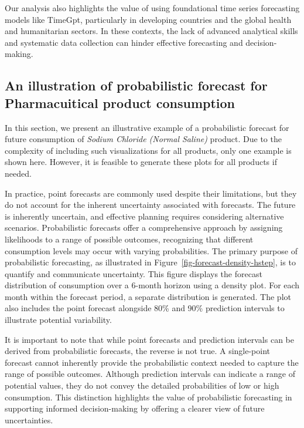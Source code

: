 \documentclass[
  authoryear,
  preprint,
  3p]{elsarticle}
\begin{document}
Our analysis also highlights the value of using foundational time series
forecasting models like TimeGpt, particularly in developing countries
and the global health and humanitarian sectors. In these contexts, the
lack of advanced analytical skills and systematic data collection can
hinder effective forecasting and decision-making.

\subsection{An illustration of probabilistic forecast for Pharmacuitical
product
consumption}\label{an-illustration-of-probabilistic-forecast-for-pharmacuitical-product-consumption}

In this section, we present an illustrative example of a probabilistic
forecast for future consumption of \emph{Sodium Chloride (Normal
Saline)} product. Due to the complexity of including such visualizations
for all products, only one example is shown here. However, it is
feasible to generate these plots for all products if needed.

In practice, point forecasts are commonly used despite their
limitations, but they do not account for the inherent uncertainty
associated with forecasts. The future is inherently uncertain, and
effective planning requires considering alternative scenarios.
Probabilistic forecasts offer a comprehensive approach by assigning
likelihoods to a range of possible outcomes, recognizing that different
consumption levels may occur with varying probabilities. The primary
purpose of probabilistic forecasting, as illustrated in
Figure~\ref{fig-forecast-density-hstep}, is to quantify and communicate
uncertainty. This figure displays the forecast distribution of
consumption over a 6-month horizon using a density plot. For each month
within the forecast period, a separate distribution is generated. The
plot also includes the point forecast alongside 80\% and 90\% prediction
intervals to illustrate potential variability.

It is important to note that while point forecasts and prediction
intervals can be derived from probabilistic forecasts, the reverse is
not true. A single-point forecast cannot inherently provide the
probabilistic context needed to capture the range of possible outcomes.
Although prediction intervals can indicate a range of potential values,
they do not convey the detailed probabilities of low or high
consumption. This distinction highlights the value of probabilistic
forecasting in supporting informed decision-making by offering a clearer
view of future uncertainties.
\end{document}
